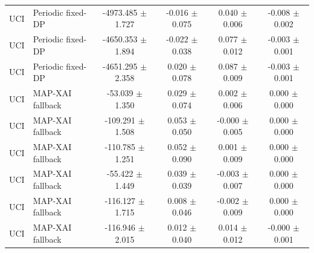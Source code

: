 \begin{tabular}{llcccc}
UCI & Periodic fixed-DP & -4973.485 $\pm$ 1.727 & -0.016 $\pm$ 0.075 & 0.040 $\pm$ 0.006 & -0.008 $\pm$ 0.002 \\
UCI & Periodic fixed-DP & -4650.353 $\pm$ 1.894 & -0.022 $\pm$ 0.038 & 0.077 $\pm$ 0.012 & -0.003 $\pm$ 0.001 \\
UCI & Periodic fixed-DP & -4651.295 $\pm$ 2.358 & 0.020 $\pm$ 0.078 & 0.087 $\pm$ 0.009 & -0.003 $\pm$ 0.001 \\
UCI & MAP-XAI fallback & -53.039 $\pm$ 1.350 & 0.029 $\pm$ 0.074 & 0.002 $\pm$ 0.006 & 0.000 $\pm$ 0.000 \\
UCI & MAP-XAI fallback & -109.291 $\pm$ 1.508 & 0.053 $\pm$ 0.050 & -0.000 $\pm$ 0.005 & 0.000 $\pm$ 0.000 \\
UCI & MAP-XAI fallback & -110.785 $\pm$ 1.251 & 0.052 $\pm$ 0.090 & 0.001 $\pm$ 0.009 & 0.000 $\pm$ 0.000 \\
UCI & MAP-XAI fallback & -55.422 $\pm$ 1.449 & 0.039 $\pm$ 0.039 & -0.003 $\pm$ 0.007 & 0.000 $\pm$ 0.000 \\
UCI & MAP-XAI fallback & -116.127 $\pm$ 1.715 & 0.008 $\pm$ 0.046 & -0.002 $\pm$ 0.009 & 0.000 $\pm$ 0.000 \\
UCI & MAP-XAI fallback & -116.946 $\pm$ 2.015 & 0.012 $\pm$ 0.040 & 0.014 $\pm$ 0.012 & -0.000 $\pm$ 0.001 \\
\bottomrule
\end{tabular}
